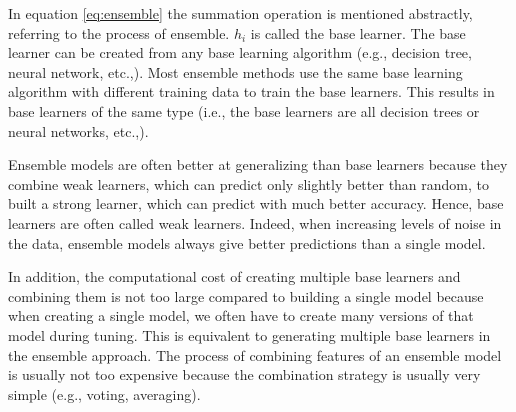 
In equation \ref{eq:ensemble} the summation operation is mentioned abstractly, referring to the process of ensemble. $h_i$ is called the base learner. The base learner can be created from any base learning algorithm (e.g., decision tree, neural network, etc.,). Most ensemble methods use the same base learning algorithm with different training data to train the base learners. This results in base learners of the same type (i.e., the base learners are all decision trees or neural networks, etc.,).


Ensemble models are often better at generalizing than base learners because they combine weak learners, which can predict only slightly better than random, to built a strong learner, which can predict with much better accuracy. Hence, base learners are often called weak learners. Indeed, when increasing levels of noise in the data, ensemble models always give better predictions than a single model.


In addition, the computational cost of creating multiple base learners and combining them is not too large compared to building a single model because when creating a single model, we often have to create many versions of that model during tuning. This is equivalent to generating multiple base learners in the ensemble approach. The process of combining features of an ensemble model is usually not too expensive because the combination strategy is usually very simple (e.g., voting, averaging).

